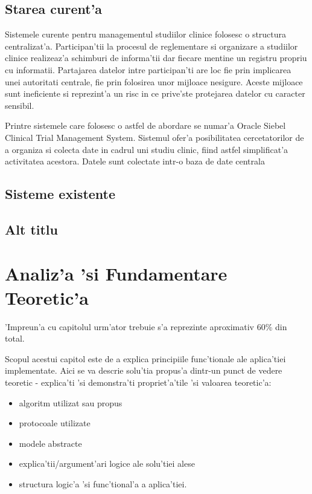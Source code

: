 \documentclass[12pt,a4paper,twoside]{report}
\begin{document}
\section{Starea curent'a} 
	Sistemele curente pentru managementul studiilor clinice folosesc o structura centralizat'a. Participan'tii la procesul de reglementare si organizare a studiilor clinice realizeaz'a schimburi de informa'tii dar fiecare mentine un registru propriu cu informatii. Partajarea datelor intre participan'ti are loc fie prin implicarea unei autoritati centrale, fie prin folosirea unor mijloace nesigure. Aceste mijloace sunt ineficiente si reprezint'a un risc in ce prive'ste protejarea datelor cu caracter sensibil.
	
	Printre sistemele care folosesc o astfel de abordare se numar'a Oracle Siebel Clinical Trial Management System\cite{ctms}. Sistemul ofer'a posibilitatea cercetatorilor de a organiza si colecta date in cadrul uni studiu clinic, fiind astfel simplificat'a activitatea acestora. Datele sunt colectate intr-o baza de date centrala 
 	


\section{Sisteme existente}
	

\section{Alt titlu}


\chapter{Analiz'a 'si Fundamentare Teoretic'a}
\label{ch:analysis}

'Impreun'a cu capitolul urm'ator trebuie s'a reprezinte aproximativ 60\% din total.

Scopul acestui capitol este de a explica principiile func'tionale ale aplica'tiei implementate. 
Aici se va descrie solu'tia propus'a dintr-un punct de vedere teoretic - explica'ti 'si demonstra'ti propriet'a'tile 'si valoarea teoretic'a:
\begin{itemize}
 \item algoritm utilizat sau propus
\item protocoale utilizate
\item modele abstracte
\item explica'tii/argument'ari logice ale solu'tiei alese
\item structura logic'a 'si func'tional'a a aplica'tiei.
\end{itemize}
\end{document}
